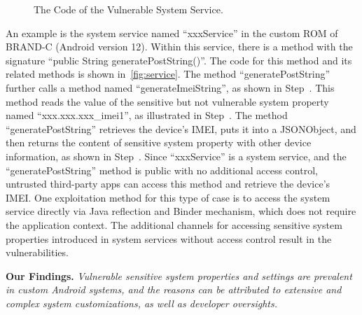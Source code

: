\begin{figure}[h]
  \centering
  \caption{The Code of the Vulnerable System Service.}
  \label{fig:service}
\end{figure}

An example is the system service named ``xxxService'' in the custom ROM of BRAND-C (Android version 12).
Within this service, there is a method with the signature ``public String generatePostString()''. The code for this method and its related methods is shown in~\autoref{fig:service}.
The method ``generatePostString'' further calls a method named ``generateImeiString'', as shown in Step~. 
This method reads the value of the sensitive but not vulnerable system property named ``xxx.xxx.xxx\_imei1'', as illustrated in Step~. 
The method ``generatePostString'' retrieves the device's IMEI, puts it into a JSONObject, and then returns the content of sensitive system property with other device information, as shown in Step~.
Since ``xxxService'' is a system service, and the ``generatePostString'' method is public with no additional access control, untrusted third-party apps can access this method and retrieve the device's IMEI.
One exploitation method for this type of case is to access the system service directly via Java reflection and Binder mechanism, which does not require the application context.
The additional channels for accessing sensitive system properties introduced in system services without access control result in the vulnerabilities.

\noindent \textbf{Our Findings.}
\textit{Vulnerable sensitive system properties and settings are prevalent in custom Android systems, and the reasons can be attributed to extensive and complex system customizations, as well as developer oversights.}

